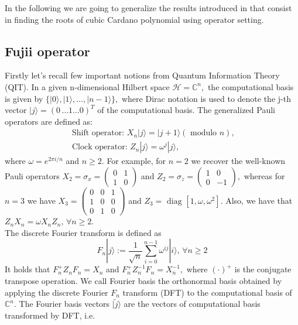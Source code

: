 \documentclass[11pt,reqno]{amsart}
\newcommand{\ket}[1]{|#1\rangle} %
\begin{document}
In the following we are going to generalize the results introduced in\cite{Fujii2013} that consist in finding the roots of cubic  Cardano polynomial using operator setting. 
\subsection{Fujii operator}
Firstly let's recall few important notions from Quantum Information Theory (QIT)\cite{NC10}. In a given n-dimensional Hilbert space $\mathcal{H}=\mathbb{C}^n,$  the computational basis is given by $\{\ket{0},\ket{1},\ldots, \ket{n-1}\},$ where Dirac notation is used to denote the j-th vector $\ket{j}=(
    0\,  \ldots 1 \ldots 0)^T $  of the computational basis. The generalized Pauli operators are defined as:
\begin{eqnarray}
    \text{ Shift operator: } X_n\ket{j}=\ket{ j+1} (\text{ modulo } n),
    \\ \text{ Clock operator: } Z_n\ket{j}=\omega^j\ket{ j},
\end{eqnarray} 
where $\omega=e^{2\pi i/n}$ and $n\geq 2$. For example, for $n=2$ we recover the well-known Pauli operators $X_2=\sigma_x=\begin{pmatrix}
    0&1\\1&0
\end{pmatrix}$ and $Z_2=\sigma_z=\begin{pmatrix}
    1&0\\0&-1
\end{pmatrix},$ whereas for $n=3$ we have  $X_3=\begin{pmatrix}
    0&0&1\\1&0&0\\0&1&0
\end{pmatrix} $ and $Z_3=\text{ diag }[1, \omega,\omega^2]$.
Also, we have that $Z_nX_n=\omega X_nZ_n, \,\forall  n \geq 2$. 
\\The discrete Fourier transform is defined as
\begin{equation}
    F_n\ket{j}:=\frac{1}{\sqrt{n}}\sum\limits_{i=0}^{n-1}\omega^{ij}\ket{i},\, \forall  n \geq 2
\end{equation}
It holds that $F_n^+Z_nF_n=X_n$ and $F_n^+Z_n^{-1}F_n=X_n^{-1},$ where $(\cdot )^+$ is the conjugate transpose operation.
We call Fourier basis  the orthonormal basis obtained  by applying the discrete Fourier $F_n$  transform (DFT) to the computational basis of $\mathbb{C}^n$. The Fourier basis vectors  $ \ket{\tilde{j}}$ are the vectors of computational basis transformed by DFT, i.e.
\end{document}
